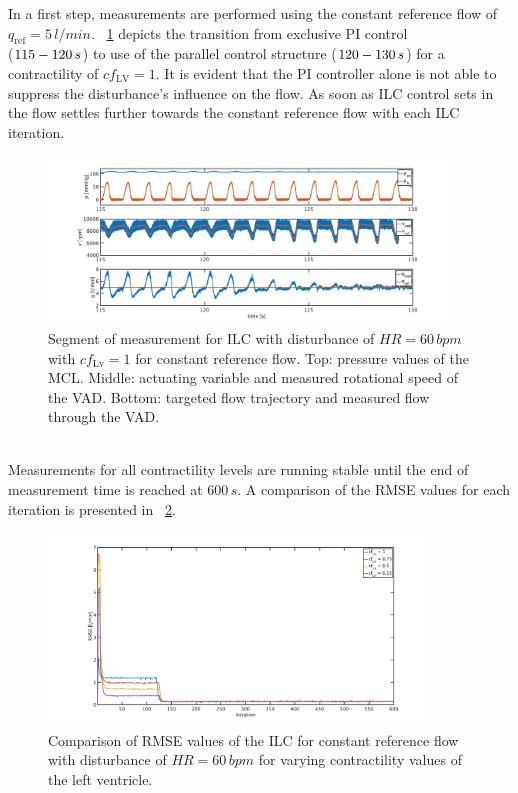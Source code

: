 In a first step, measurements are performed using the constant reference flow of $q_{\mathrm{ref}}=5\,l/min$. \figurename~\ref{fig:pi_to_ilc_dist_const_cf1} depicts the transition from exclusive PI control \\($115 \-- 120\,s$) to use of the parallel control structure ($120\--130\,s$) for a contractility of $cf_{\mathrm{LV}}=1$. It is evident that the PI controller alone is not able to suppress the disturbance's influence on the flow. As soon as ILC control sets in the flow settles further towards the constant reference flow with each ILC iteration.
\begin{figure}[ht!]
  \centering
  \includegraphics[width=0.95\textwidth]{images/chapt_5/ILC/pi_to_ilc_dist_const_cf1.pdf}
  \caption[Segment of measurement for ILC with disturbance of $HR=60\,bpm$ with $cf_{\mathrm{Lv}}=1$ for constant reference flow]{Segment of measurement for ILC with disturbance of $HR=60\,bpm$ with $cf_{\mathrm{Lv}}=1$ for constant reference flow. Top:  pressure values of the MCL. Middle: actuating variable and measured rotational speed of the VAD. Bottom: targeted flow trajectory and measured flow through the VAD.}
  \label{fig:pi_to_ilc_dist_const_cf1}
\end{figure}
\\Measurements for all contractility levels are running stable until the end of measurement time is reached at $600\,s$. A comparison of the RMSE values for each iteration is presented in \figurename~\ref{fig:RMSE_dist_const_5_var_cf}.
\begin{figure}[ht]
  \centering
  \includegraphics[width=0.9\textwidth]{images/chapt_5/ILC/RMSE_dist_const_5_var_cf.pdf}
  \caption[RMSE Comparison of ILC at constant reference flow for varying left ventricular contractilities]{Comparison of RMSE values of the ILC for constant reference flow with disturbance of $HR=60\,bpm$ for varying contractility values of the left ventricle.}
  \label{fig:RMSE_dist_const_5_var_cf}
\end{figure}


